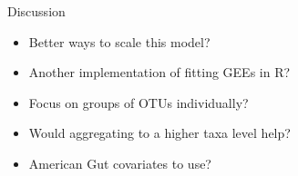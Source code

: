 \documentclass{beamer}
\begin{document}
\begin{frame}[t]{Discussion}
  \begin{itemize}
    \item Better ways to scale this model?
    \item Another implementation of fitting GEEs in R? 
    \item Focus on groups of OTUs individually?
    \item Would aggregating to a higher taxa level help?
    \item American Gut covariates to use?
  \end{itemize}
\end{frame}





%

\end{document}
